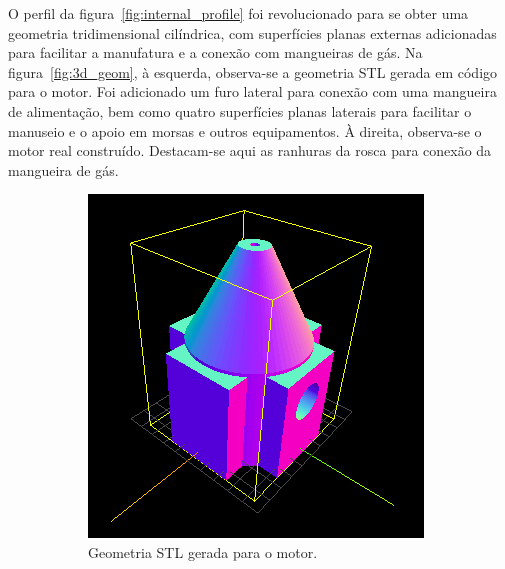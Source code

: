 O perfil da figura~\ref{fig:internal_profile} foi revolucionado para se obter uma geometria tridimensional cilíndrica, com superfícies planas externas adicionadas para facilitar a manufatura e a conexão com mangueiras de gás. Na figura~\ref{fig:3d_geom}, à esquerda, observa-se a geometria STL gerada em código para o motor. Foi adicionado um furo lateral para conexão com uma mangueira de alimentação, bem como quatro superfícies planas laterais para facilitar o manuseio e o apoio em morsas e outros equipamentos. À direita, observa-se o motor real construído. Destacam-se aqui as ranhuras da rosca para conexão da mangueira de gás.

\begin{figure}[htbp]
    \centering
    \begin{subfigure}{0.49\textwidth}
        \includegraphics[width=\textwidth]{img/motor_stl.png}
        \caption{Geometria STL gerada para o motor.}
    \end{subfigure}
    \begin{subfigure}{0.49\textwidth}

\end{subfigure}
\end{figure}
